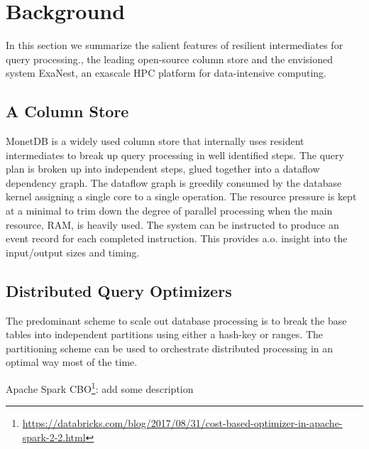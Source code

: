 \section{Background}
\label{Background}
In this section we summarize the salient features of resilient intermediates
for query processing., the leading open-source column store and the envisioned
system ExaNest, an exascale HPC platform for data-intensive computing.

\subsection{A Column Store}
MonetDB is a widely used column store that internally uses resident
intermediates to break up query processing in well identified steps.
The query plan is broken up into independent steps, glued together into a
dataflow dependency graph. The dataflow graph is greedily consumed by the
database kernel assigning a single core to a single operation.
The resource pressure is kept at a minimal to trim down the degree of parallel
processing when the main resource, RAM, is heavily used.
The system can be instructed to produce an event record for each completed instruction.
This provides a.o. insight into the input/output sizes and timing.

\subsection{Distributed Query Optimizers}
The predominant scheme to scale out database processing is to break the base
tables into independent partitions using either a hash-key or ranges.
The partitioning scheme can be used to orchestrate distributed processing
in an optimal way most of the time.

Apache Spark CBO\footnote{\url{https://databricks.com/blog/2017/08/31/cost-based-optimizer-in-apache-spark-2-2.html}}: add some description


